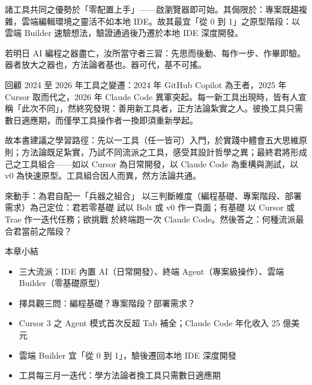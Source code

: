諸工具共同之優勢於「零配置上手」——啟瀏覽器即可始。其侷限於：專案既趨複雜，雲端編輯環境之靈活不如本地 IDE。故其最宜「從 0 到 1」之原型階段：以雲端 Builder 速驗想法，驗證通過後乃遷於本地 IDE 深度開發。


若明日 AI 編程之器盡亡，汝所當守者三習：先思而後動、每作一步、作畢即驗。器者放大之器也，方法論者基也。器可代，基不可搖。

回顧 2024 至 2026 年工具之變遷：2024 年 GitHub Copilot 為王者，2025 年 Cursor 取而代之，2026 年 Claude Code 異軍突起。每一新工具出現時，皆有人宣稱「此次不同」，然終究發現：善用新工具者，正方法論紮實之人。彼換工具只需數日適應期，而僅學工具操作者一換即須重新學起。

故本書建議之學習路徑：先以一工具（任一皆可）入門，於實踐中體會五大思維原則；方法論既足紮實，乃試不同流派之工具，感受其設計哲學之異；最終君將形成己之工具組合——如以 Cursor 為日常開發，以 Claude Code 為重構與測試，以 v0 為快速原型。工具組合因人而異，然方法論共通。

\begin{tcbpractice}{來動手：為君自配一「兵器之組合」}
以三判斷維度（編程基礎、專案階段、部署需求）為己定位：君若零基礎 試以 Bolt 或 v0 作一頁面；有基礎 以 Cursor 或 Trae 作一迭代任務；欲挑戰 於終端跑一次 Claude Code。然後答之：何種流派最合君當前之階段？

\end{tcbpractice}

\begin{tcbsummary}{本章小結}
\begin{itemize}
  \item 三大流派：IDE 內置 AI（日常開發）、終端 Agent（專案級操作）、雲端 Builder（零基礎原型）
  \item 擇具觀三問：編程基礎？專案階段？部署需求？
  \item Cursor 3 之 Agent 模式首次反超 Tab 補全；Claude Code 年化收入 25 億美元
  \item 雲端 Builder 宜「從 0 到 1」，驗後遷回本地 IDE 深度開發
  \item 工具每三月一迭代：學方法論者換工具只需數日適應期
\end{itemize}

\end{tcbsummary}
